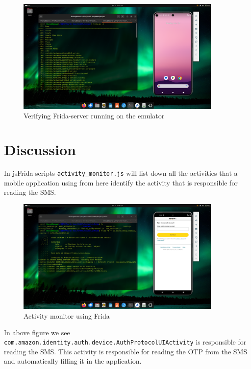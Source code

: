 \documentclass[a4paper,12pt]{article}
\begin{document}
\begin{figure}[h]
    \centering
    \includegraphics[width=0.9\textwidth]{../images/verifying-frida-running.png}
    \caption{Verifying Frida-server running on the emulator}
\end{figure}

\section{Discussion}
In jsFrida scripts \texttt{activity\_monitor.js} will list down all the activities that a mobile application using from here identify the activity that is responsible for reading the SMS.
\begin{figure}[h]
    \centering
    \includegraphics[width=0.9\textwidth]{../images/activity-monitor.png}
    \caption{Activity monitor using Frida}
\end{figure}

In above figure we see \texttt{com.amazon.identity.auth.device.AuthProtocolUIActivity} is responsible for reading the SMS. This activity is responsible for reading the OTP from the SMS and automatically filling it in the application.
\end{document}
